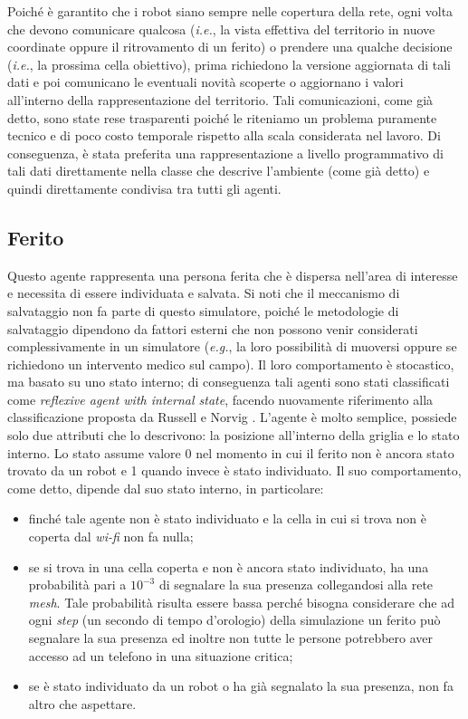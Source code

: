 Poiché è garantito che i robot siano sempre nelle copertura della rete, ogni volta che devono comunicare qualcosa (\textit{i.e.}, la vista effettiva del territorio in nuove coordinate oppure il ritrovamento di un ferito) o prendere una qualche decisione (\textit{i.e.}, la prossima cella obiettivo), prima richiedono la versione aggiornata di tali dati e poi comunicano le eventuali novità scoperte o aggiornano i valori all'interno della rappresentazione del territorio.
Tali comunicazioni, come già detto, sono state rese trasparenti poiché le riteniamo un problema puramente tecnico e di poco costo temporale rispetto alla scala considerata nel lavoro. Di conseguenza, è stata preferita una rappresentazione a livello programmativo di tali dati direttamente nella classe che descrive l'ambiente (come già detto) e quindi direttamente condivisa tra tutti gli agenti.


\subsection{Ferito}
\label{Ferito}
Questo agente rappresenta una persona ferita che è dispersa nell'area di interesse e necessita di essere individuata e salvata. Si noti che il meccanismo di salvataggio non fa parte di questo simulatore, poiché le metodologie di salvataggio dipendono da fattori esterni che non possono venir considerati complessivamente in un simulatore (\textit{e.g.}, la loro possibilità di muoversi oppure se richiedono un intervento medico sul campo).
Il loro comportamento è stocastico, ma basato su uno stato interno; di conseguenza tali agenti sono stati classificati come \textit{reflexive agent with internal state}, facendo nuovamente riferimento alla classificazione proposta da Russell e Norvig \cite{russell2016}.
L'agente è molto semplice, possiede solo due attributi che lo descrivono: la posizione all'interno della griglia e lo stato interno. Lo stato assume valore 0 nel momento in cui il ferito non è ancora stato trovato da un robot e 1 quando invece è stato individuato.
Il suo comportamento, come detto, dipende dal suo stato interno, in particolare: 
\begin{itemize}
	\item finché tale agente non è stato individuato e la cella in cui si trova non è coperta dal \textit{wi-fi} non fa nulla;
	\item se si trova in una cella coperta e non è ancora stato individuato, ha una probabilità pari a $10^{-3}$ di segnalare la sua presenza collegandosi alla rete \textit{mesh}. Tale probabilità risulta essere bassa perché bisogna considerare che ad ogni \textit{step} (un secondo di tempo d'orologio) della simulazione un ferito può segnalare la sua presenza ed inoltre non tutte le persone potrebbero aver accesso ad un telefono in una situazione critica;
	\item se è stato individuato da un robot o ha già segnalato la sua presenza, non fa altro che aspettare.
\end{itemize}

